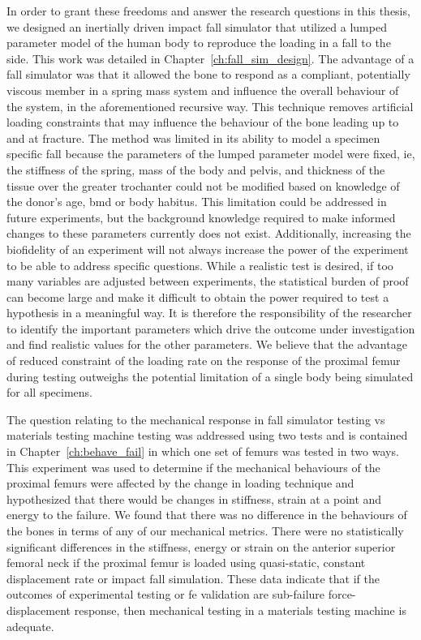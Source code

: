 In order to grant these freedoms and answer the research questions in this thesis, we designed an inertially driven impact fall simulator that utilized a lumped parameter model of the human body to reproduce the loading in a fall to the side.
This work was detailed in Chapter~\ref{ch:fall_sim_design}.
The advantage of a fall simulator was that it allowed the bone to respond as a compliant, potentially viscous member in a spring mass system and influence the overall behaviour of the system, in the aforementioned recursive way.
This technique removes artificial loading constraints that may influence the behaviour of the bone leading up to and at fracture.
The method was limited in its ability to model a specimen specific fall because the parameters of the lumped parameter model were fixed, \ac{ie}, the stiffness of the spring, mass of the body and pelvis, and thickness of the tissue over the greater trochanter could not be modified based on knowledge of the donor's age, \ac{bmd} or body habitus.
This limitation could be addressed in future experiments, but the background knowledge required to make informed changes to these parameters currently does not exist.
Additionally, increasing the biofidelity of an experiment will not always increase the power of the experiment to be able to address specific questions.
While a realistic test is desired, if too many variables are adjusted between experiments, the statistical burden of proof can become large and make it difficult to obtain the power required to test a hypothesis in a meaningful way.
It is therefore the responsibility of the researcher to identify the important parameters which drive the outcome under investigation and find realistic values for the other parameters.
We believe that the advantage of reduced constraint of the loading rate on the response of the proximal femur during testing outweighs the potential limitation of a single body being simulated for all specimens.

The question relating to the mechanical response in fall simulator testing \ac{vs} materials testing machine testing was addressed using two tests and is contained in Chapter~\ref{ch:behave_fail} in which one set of femurs was tested in two ways.
This experiment was used to determine if the mechanical behaviours of the proximal femurs were affected by the change in loading technique and hypothesized that there would be changes in stiffness, strain at a point and energy to the failure.
We found that there was no difference in the behaviours of the bones in terms of any of our mechanical metrics.
There were no statistically significant differences in the stiffness, energy or strain on the anterior superior femoral neck if the proximal femur is loaded using quasi-static, constant displacement rate or impact fall simulation.
These data indicate that if the outcomes of experimental testing or \ac{fe} validation are sub-failure force-displacement response, then mechanical testing in a materials testing machine is adequate.

